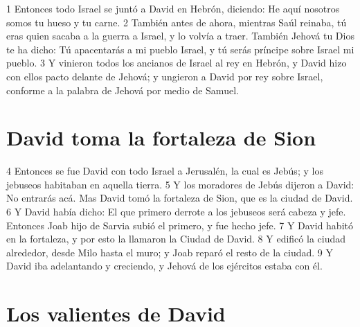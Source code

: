 1 Entonces todo Israel se juntó a David en Hebrón, diciendo: He aquí nosotros somos tu hueso y tu carne.
2 También antes de ahora, mientras Saúl reinaba, tú eras quien sacaba a la guerra a Israel, y lo volvía a traer. También Jehová tu Dios te ha dicho: Tú apacentarás a mi pueblo Israel, y tú serás príncipe sobre Israel mi pueblo.
3 Y vinieron todos los ancianos de Israel al rey en Hebrón, y David hizo con ellos pacto delante de Jehová; y ungieron a David por rey sobre Israel, conforme a la palabra de Jehová por medio de Samuel.

\section*{David toma la fortaleza de Sion}


4 Entonces se fue David con todo Israel a Jerusalén, la cual es Jebús; y los jebuseos habitaban en aquella tierra. 
5 Y los moradores de Jebús dijeron a David: No entrarás acá. Mas David tomó la fortaleza de Sion, que es la ciudad de David.
6 Y David había dicho: El que primero derrote a los jebuseos será cabeza y jefe. Entonces Joab hijo de Sarvia subió el primero, y fue hecho jefe.
7 Y David habitó en la fortaleza, y por esto la llamaron la Ciudad de David.
8 Y edificó la ciudad alrededor, desde Milo hasta el muro; y Joab reparó el resto de la ciudad.
9 Y David iba adelantando y creciendo, y Jehová de los ejércitos estaba con él.

\section*{Los valientes de David}

